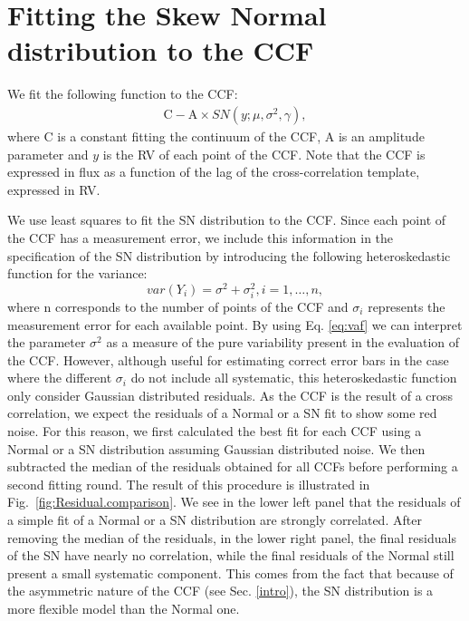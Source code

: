 \documentclass[11pt, oneside]{article}
\begin{document}
\section{Fitting the Skew Normal distribution to the CCF} \label{sec:3}

We fit the following function to the CCF:
%
\begin{eqnarray} \label{eq:3}
\mathrm{C} - \mathrm{A} \times SN(y;\mu, \sigma^2, \gamma),
\end{eqnarray}
%
where C is a constant fitting the continuum of the CCF, A is an amplitude parameter and $y$ is the RV of each point of the CCF. Note that the CCF is expressed in flux as a function of the lag of the cross-correlation template, expressed in RV.

We use least squares to fit the SN distribution to the CCF. Since each point of the CCF has a measurement error, we include this information in the specification of the SN distribution by introducing the following heteroskedastic function for the variance:
%
\begin{equation}
var(Y_{i})=\sigma^{2}+\sigma_{i}^{2}, i = 1, \dots, n,
\label{eq:vaf}
\end{equation}
%
where n corresponds to the number of points of the CCF and $\sigma_{i}$ represents the measurement error for each available point. By using Eq. \ref{eq:vaf} we can interpret the parameter $\sigma^{2}$ as a measure of the pure variability present in the evaluation of the CCF. However, although useful for estimating correct error bars in the case where the different $\sigma_{i}$ do not include all systematic, this heteroskedastic function only consider Gaussian distributed residuals. As the CCF is the result of a cross correlation, we expect the residuals of a Normal or a SN fit to show some red noise. For this reason, we first calculated the best fit for each CCF using a Normal or a SN distribution assuming Gaussian distributed noise. We then subtracted the median of the residuals obtained for all CCFs before performing a second fitting round. The result of this procedure is illustrated in Fig.~\ref{fig:Residual.comparison}. We see in the lower left panel that the residuals of a simple fit of a Normal or a SN distribution are strongly correlated. After removing the median of the residuals, in the lower right panel, the final residuals of the SN have nearly no correlation, while the final residuals of the Normal still present a small systematic component. This comes from the fact that because of the asymmetric nature of the CCF (see Sec. \ref{intro}), the SN distribution is a more flexible model than the Normal one.
\end{document}
